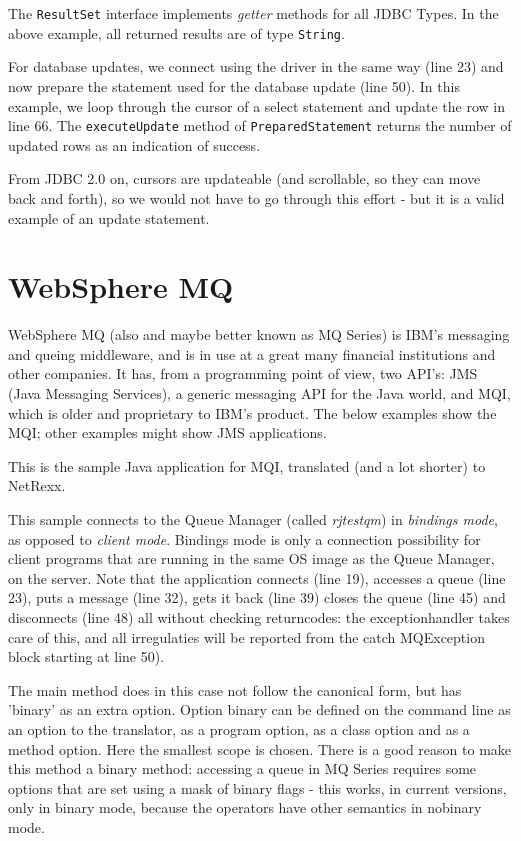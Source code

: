 {The \texttt{ResultSet} interface implements \emph{getter} methods for
  all JDBC Types. In the above example, all returned results are of
  type \texttt{String}.

 
For database updates, we connect using the driver in the same way
(line 23) and now prepare the statement used for the database update
(line 50). In this example, we loop through the cursor of a select
statement and update the row in line 66. The \texttt{executeUpdate}
method of \texttt{PreparedStatement} returns the number of updated
rows as an indication of success.

From JDBC 2.0 on, cursors are updateable (and scrollable, so they can
move back and forth), so we would not have to go
through this effort - but it is a valid example of an update statement.
\chapter{WebSphere MQ}
WebSphere MQ (also and maybe better known as MQ Series) is IBM's
messaging and queing middleware, and is in use at a great many financial
institutions and other companies. It has, from a programming point of
view, two API's: JMS (Java Messaging Services), a generic messaging
API for the Java world, and MQI, which is older and proprietary to
IBM's product. The below examples show the MQI; other examples might
show JMS applications.

This is the sample Java application for MQI, translated (and a lot
shorter) to NetRexx.

This sample connects to the Queue Manager (called \emph{rjtestqm}) in
\emph{bindings mode}, as opposed to \emph{client mode}. Bindings mode
is only a connection possibility for client programs that are running
in the same OS image as the Queue Manager, on the server. Note that
the application connects (line 19), accesses a queue (line 23), puts a
message (line 32), gets it back (line 39) closes the queue (line 45) and disconnects (line 48) all without checking
returncodes: the exceptionhandler takes care of this, and all
irregulaties will be reported from the catch MQException block
starting at line 50).

The main method does in this case not follow the canonical form, but
has 'binary' as an extra option. Option binary can be defined on the
command line as an option to the translator, as a program option, as a
class option and as a method option. Here the smallest scope is
chosen. There is a good reason to make this method a binary method:
accessing a queue in MQ Series requires some options that are set
using a mask of binary flags - this works, in current \nr{} versions,
only in binary mode, because the operators have other semantics in
nobinary mode.

}
